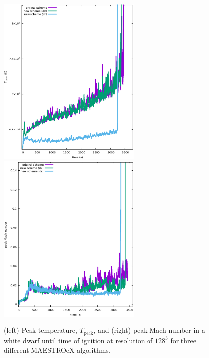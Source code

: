 \begin{figure}[htb]
\begin{center}
\includegraphics[width=2.75in]{./figs/wdconvect_128_maxT}  \hspace{0.5in}
\includegraphics[width=2.75in]{./figs/wdconvect_128_maxMach}
\caption{\label{fig:wdconvect_128_maxval} (left) Peak temperature, $T_{\text{peak}}$, and (right) peak Mach number 
         in a white dwarf until time of ignition at resolution of $128^3$ for three different MAESTROeX algorithms.}
\end{center}
\end{figure}

